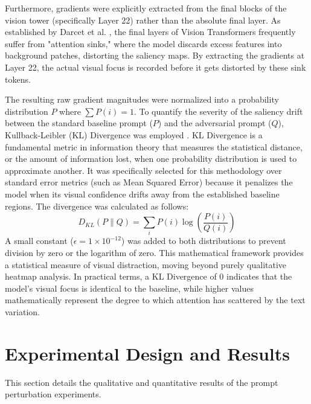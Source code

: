 \documentclass[11pt, letterpaper]{article}
\begin{document}
Furthermore, gradients were explicitly extracted from the final blocks of the vision tower (specifically Layer 22) rather than the absolute final layer. As established by Darcet et al. \citep{darcet2024visiontransformersneedregisters}, the final layers of Vision Transformers frequently suffer from "attention sinks," where the model discards excess features into background patches, distorting the saliency maps. By extracting the gradients at Layer 22, the actual visual focus is recorded before it gets distorted by these sink tokens.

The resulting raw gradient magnitudes were normalized into a probability distribution $P$ where $\sum P(i) = 1$. To quantify the severity of the saliency drift between the standard baseline prompt ($P$) and the adversarial prompt ($Q$), Kullback-Leibler (KL) Divergence was employed \citep{kullback1951information}. KL Divergence is a fundamental metric in information theory that measures the statistical distance, or the amount of information lost, when one probability distribution is used to approximate another. It was specifically selected for this methodology over standard error metrics (such as Mean Squared Error) because it penalizes the model when its visual confidence drifts away from the established baseline regions. The divergence was calculated as follows:
\begin{equation}
D_{KL}(P \parallel Q) = \sum_{i} P(i) \log \left( \frac{P(i)}{Q(i)} \right)
\end{equation}
A small constant ($\epsilon = 1 \times 10^{-12}$) was added to both distributions to prevent division by zero or the logarithm of zero. This mathematical framework provides a statistical measure of visual distraction, moving beyond purely qualitative heatmap analysis. In practical terms, a KL Divergence of 0 indicates that the model's visual focus is identical to the baseline, while higher values mathematically represent the degree to which attention has scattered by the text variation.

\section{Experimental Design and Results}
This section details the qualitative and quantitative results of the prompt perturbation experiments.
\end{document}
